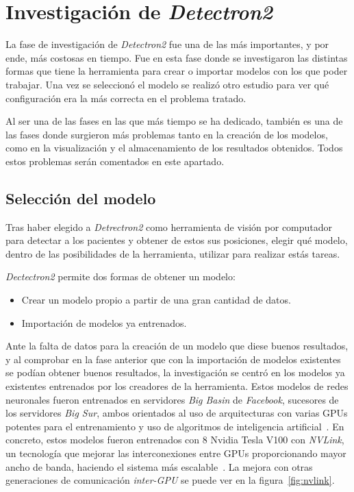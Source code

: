 \section{Investigación de \textit{Detectron2}}
La fase de investigación de \textit{Detectron2} fue una de las más importantes, y por ende, más costosas en tiempo. Fue en esta fase donde se investigaron las distintas formas que tiene la herramienta para crear o importar modelos con los que poder trabajar. Una vez se seleccionó el modelo se realizó otro estudio para ver qué configuración era la más correcta en el problema tratado.

Al ser una de las fases en las que más tiempo se ha dedicado, también es una de las fases donde surgieron más problemas tanto en la creación de los modelos, como en la visualización y el almacenamiento de los resultados obtenidos. Todos estos problemas serán comentados en este apartado.  
\subsection{Selección del modelo}
Tras haber elegido a \textit{Detrectron2} como herramienta de visión por computador para detectar a los pacientes y obtener de estos sus posiciones, elegir qué modelo, dentro de las posibilidades de la herramienta, utilizar para realizar estás tareas.

\textit{Dectectron2} permite dos formas de obtener un modelo:
\begin{itemize}
	\item Crear un modelo propio a partir de una gran cantidad de datos.
	\item Importación de modelos ya entrenados.
\end{itemize}

Ante la falta de datos para la creación de un modelo que diese buenos resultados, y al comprobar en la fase anterior que con la importación de modelos existentes se podían obtener buenos resultados, la investigación se centró en los modelos ya existentes entrenados por los creadores de la herramienta. Estos modelos de redes neuronales fueron entrenados en servidores \textit{Big Basin} de \textit{Facebook}, sucesores de los servidores \textit{Big Sur}, ambos orientados al uso de arquitecturas con varias GPUs potentes para el entrenamiento y uso de algoritmos de inteligencia artificial~\cite{bigbasin}. En concreto, estos modelos fueron entrenados con 8 Nvidia Tesla V100 con \textit{NVLink}, un tecnología que mejorar las interconexiones entre GPUs proporcionando mayor ancho de banda, haciendo el sistema más escalable~\cite{nvlink}. La mejora con otras generaciones de comunicación \textit{inter-GPU} se puede ver en la figura~\ref{fig:nvlink}.

